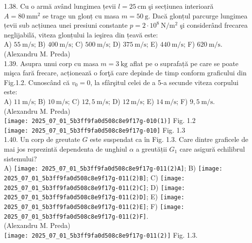 1.38. Cu o armă având lungimea țevii $l=25 \mathrm{~cm}$ şi secțiunea interioară $A=80 \mathrm{~mm}^{2}$ se trage un glonț cu masa $m=50 \mathrm{~g}$. Dacă glonțul parcurge lungimea țevii sub acțiunea unei presiuni constante $p=2 \cdot 10^{8} \mathrm{~N} / \mathrm{m}^{2}$ şi considerând frecarea neglijabilă, viteza glonțului la ieşirea din țeavă este:\\ A) $55 \mathrm{~m} / \mathrm{s}$; B) $400 \mathrm{~m} / \mathrm{s}$; C) $500 \mathrm{~m} / \mathrm{s}$; D) $375 \mathrm{~m} / \mathrm{s}$; E) $440 \mathrm{~m} / \mathrm{s}$; F) $620 \mathrm{~m} / \mathrm{s}$.\\ (Alexandru M. Preda)\\

1.39. Asupra unui corp cu masa $m=3 \mathrm{~kg}$ aflat pe o suprafață pe care se poate mişca fară frecare, acționează o forţă care depinde de timp conform graficului din Fig.1.2. Cunoscând că $v_{0}=0$, la sfârşitul celei de a 5-a secunde viteza corpului este:\\ A) $11 \mathrm{~m} / \mathrm{s}$; B) $10 \mathrm{~m} / \mathrm{s}$; C) $12,5 \mathrm{~m} / \mathrm{s}$; D) $12 \mathrm{~m} / \mathrm{s}$; E) $14 \mathrm{~m} / \mathrm{s}$; F) $9,5 \mathrm{~m} / \mathrm{s}$.\\ (Alexandru M. Preda)\\ \texttt{[image: 2025\_07\_01\_5b3ff9fa0d508c8e9f17g-010(1)]} Fig. 1.2\\ \texttt{[image: 2025\_07\_01\_5b3ff9fa0d508c8e9f17g-010]} Fig. 1.3\\

1.40. Un corp de greutate $G$ este suspendat ca în Fig. 1.3. Care dintre graficele de mai jos reprezintă dependenta de unghiul $\alpha$ a greutății $G_{1}$ care asigură echilibrul sistemului?\\ A) \texttt{[image: 2025\_07\_01\_5b3ff9fa0d508c8e9f17g-011(2)A]}; B) \texttt{[image: 2025\_07\_01\_5b3ff9fa0d508c8e9f17g-011(2)B]}; C) \texttt{[image: 2025\_07\_01\_5b3ff9fa0d508c8e9f17g-011(2)C]}; D) \texttt{[image: 2025\_07\_01\_5b3ff9fa0d508c8e9f17g-011(2)D]}; E) \texttt{[image: 2025\_07\_01\_5b3ff9fa0d508c8e9f17g-011(2)E]}; F) \texttt{[image: 2025\_07\_01\_5b3ff9fa0d508c8e9f17g-011(2)F]}.\\ (Alexandru M. Preda)\\ \texttt{[image: 2025\_07\_01\_5b3ff9fa0d508c8e9f17g-011(2)]} Fig. 1.3.\\

